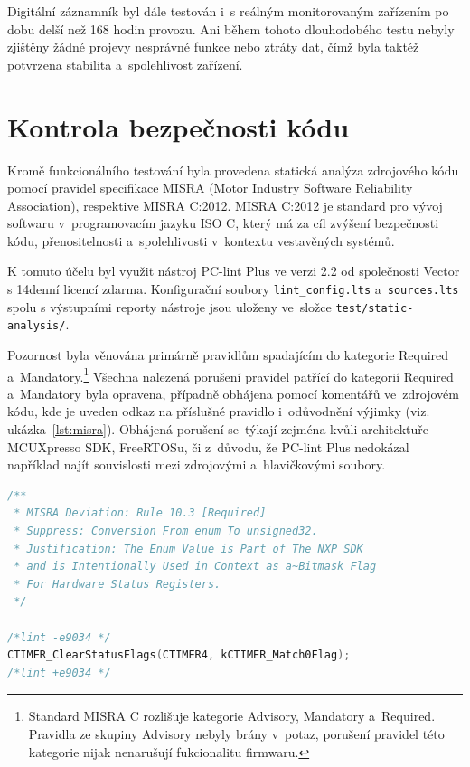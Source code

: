 Digitální záznamník byl dále testován i~s reálným monitorovaným zařízením po dobu delší než 168 hodin provozu. Ani během tohoto dlouhodobého testu nebyly zjištěny žádné projevy nesprávné funkce nebo ztráty dat, čímž byla taktéž potvrzena stabilita a~spolehlivost zařízení.

\section{Kontrola bezpečnosti kódu}
Kromě funkcionálního testování byla provedena statická analýza zdrojového kódu pomocí pravidel specifikace MISRA (Motor Industry Software Reliability Association), respektive MISRA C:2012. MISRA C:2012 je standard pro vývoj softwaru v~programovacím jazyku ISO C, který má za cíl zvýšení bezpečnosti kódu, přenositelnosti a~spolehlivosti v~kontextu vestavěných systémů.

K tomuto účelu byl využit nástroj PC-lint Plus ve verzi 2.2 od společnosti Vector s 14denní licencí zdarma. Konfigurační soubory \texttt{lint\_config.lts} a~\texttt{sources.lts} spolu s výstupními reporty nástroje jsou uloženy ve~složce \texttt{test/static-analysis/}.

Pozornost byla věnována primárně pravidlům spadajícím do kategorie Required a~Mandatory.\footnote{Standard MISRA C rozlišuje kategorie Advisory, Mandatory a~Required. Pravidla ze skupiny Advisory nebyly brány v~potaz, porušení pravidel této kategorie nijak nenarušují fukcionalitu firmwaru.} Všechna nalezená porušení pravidel patřící do kategorií Required a~Mandatory byla opravena, případně obhájena pomocí komentářů ve~zdrojovém kódu, kde je uveden odkaz na příslušné pravidlo i~odůvodnění výjimky (viz. ukázka~\ref{lst:misra}). Obhájená porušení se~týkají zejména kvůli architektuře MCUXpresso SDK, FreeRTOSu, či z~důvodu, že PC-lint Plus nedokázal například najít souvislosti mezi zdrojovými a~hlavičkovými soubory.

\newpage

\begin{lstlisting}[language=C, caption={Ukázka odůvodněného porušení pravidla MISRA}, label={lst:misra}]
/**
 * MISRA Deviation: Rule 10.3 [Required]
 * Suppress: Conversion From enum To unsigned32.
 * Justification: The Enum Value is Part of The NXP SDK
 * and is Intentionally Used in Context as a~Bitmask Flag 
 * For Hardware Status Registers.
 */

/*lint -e9034 */
CTIMER_ClearStatusFlags(CTIMER4, kCTIMER_Match0Flag);
/*lint +e9034 */
\end{lstlisting}

